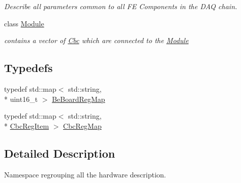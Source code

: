 \begin{DoxyCompactItemize}
\begin{DoxyCompactList}\small\item\em Describe all parameters common to all F\-E Components in the D\-A\-Q chain. \end{DoxyCompactList}\item 
class \hyperlink{class_ph2___hw_description_1_1_module}{Module}
\begin{DoxyCompactList}\small\item\em contains a vector of \hyperlink{class_ph2___hw_description_1_1_cbc}{Cbc} which are connected to the \hyperlink{class_ph2___hw_description_1_1_module}{Module} \end{DoxyCompactList}\end{DoxyCompactItemize}
\subsection*{Typedefs}
\begin{DoxyCompactItemize}
\item 
typedef std\-::map$<$ std\-::string, \\*
uint16\-\_\-t $>$ \hyperlink{namespace_ph2___hw_description_a2e13fb82c8ed98154c60f9d0f8467d72}{Be\-Board\-Reg\-Map}
\item 
typedef std\-::map$<$ std\-::string, \\*
\hyperlink{struct_ph2___hw_description_1_1_cbc_reg_item}{Cbc\-Reg\-Item} $>$ \hyperlink{namespace_ph2___hw_description_a9a23b373068f169aa67ca1d22c9a6001}{Cbc\-Reg\-Map}
\end{DoxyCompactItemize}


\subsection{Detailed Description}
Namespace regrouping all the hardware description. 

